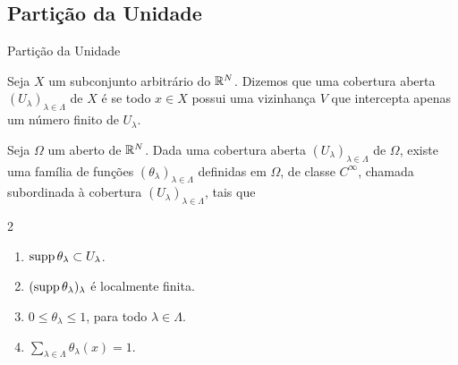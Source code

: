 \subsection*{Partição da Unidade}
\begin{frame}{Partição da Unidade}
	\begin{defin}
		Seja $X$ um subconjunto arbitrário do $\mathbb{R}^N$. Dizemos que uma cobertura aberta $(U_\lambda)_{\lambda\in \Lambda}$ de $X$ é  se todo $x\in X$ possui  uma vizinhança $V$ que intercepta apenas um número finito de $U_\lambda$.
	\end{defin}
	
	\begin{prop}
		Seja $\Omega $ um aberto de $\mathbb{R}^N$. Dada uma cobertura aberta $(U_\lambda)_{\lambda\in \Lambda}$ de $\Omega$, existe uma família de funções   $(\theta_\lambda)_{\lambda\in \Lambda}$ definidas em $\Omega$, de classe $C^\infty$, chamada  subordinada à cobertura $(U_\lambda)_{\lambda\in\Lambda}$, tais que
		\begin{multicols}{2}
			\begin{enumerate}
				\item $\operatorname{supp} \theta_\lambda\subset U_\lambda$.
				\item $(\operatorname{supp} \theta _\lambda)_\lambda$ é localmente finita.
				\item $0\leq \theta_\lambda \leq 1$, para todo $\lambda \in \Lambda$.
				\item $\sum_{\lambda\in \Lambda}\theta_\lambda (x)=1$.\\
			\end{enumerate}
			
		\end{multicols}
	\end{prop}
	
\end{frame}

